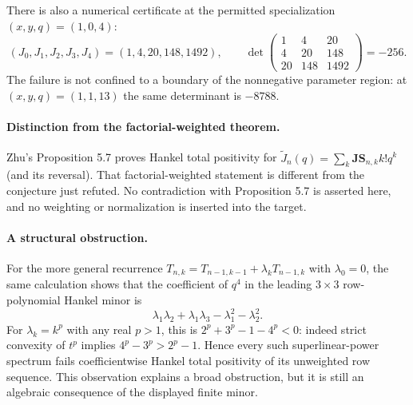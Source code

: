 \documentclass[11pt,a4paper]{article}
\numberwithin{equation}{section}
\begin{document}
There is also a numerical certificate at the permitted specialization
$(x,y,q)=(1,0,4)$:
\[
 (J_0,J_1,J_2,J_3,J_4)=(1,4,20,148,1492),\qquad
 \det\!\begin{pmatrix}
 1&4&20\\4&20&148\\20&148&1492
 \end{pmatrix}=-256.
\]
The failure is not confined to a boundary of the nonnegative parameter
region: at $(x,y,q)=(1,1,13)$ the same determinant is $-8788$.

\paragraph{Distinction from the factorial-weighted theorem.}
Zhu's Proposition 5.7 proves Hankel total positivity for
$\widetilde J_n(q)=\sum_k\mathbf{JS}_{n,k}k!q^k$ (and its reversal).
That factorial-weighted statement is different from the conjecture just
refuted.  No contradiction with Proposition 5.7 is asserted here, and
no weighting or normalization is inserted into the target.

\paragraph{A structural obstruction.}
For the more general recurrence
$T_{n,k}=T_{n-1,k-1}+\lambda_kT_{n-1,k}$ with $\lambda_0=0$, the same
calculation shows that the coefficient of $q^4$ in the leading
$3\times3$ row-polynomial Hankel minor is
\[
 \lambda_1\lambda_2+\lambda_1\lambda_3
 -\lambda_1^2-\lambda_2^2.
\]
For $\lambda_k=k^p$ with any real $p>1$, this is
$2^p+3^p-1-4^p<0$: indeed strict convexity of $t^p$ implies
$4^p-3^p>2^p-1$.  Hence every such superlinear-power spectrum fails
coefficientwise Hankel total positivity of its unweighted row sequence.
This observation explains a broad obstruction, but it is still an
algebraic consequence of the displayed finite minor.
\end{document}
